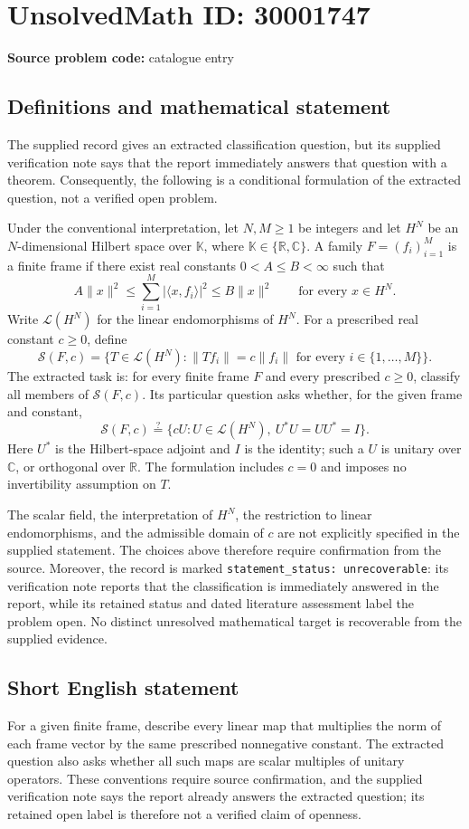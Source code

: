 \documentclass[11pt]{article}
\newcommand{\R}{\mathbb{R}}
\newcommand{\C}{\mathbb{C}}
\begin{document}
\section*{UnsolvedMath ID: 30001747}
\textbf{Source problem code:} catalogue entry
\subsection{Definitions and mathematical statement}
The supplied record gives an extracted classification question, but its supplied verification note says that the report immediately answers that question with a theorem. Consequently, the following is a conditional formulation of the extracted question, not a verified open problem.

Under the conventional interpretation, let \(N,M\geq 1\) be integers and let \(H^N\) be an \(N\)-dimensional Hilbert space over \(\mathbb K\), where \(\mathbb K\in\{\R,\C\}\). A family \(F=(f_i)_{i=1}^M\) is a finite frame if there exist real constants \(0<A\leq B<\infty\) such that
\[
A\lVert x\rVert^2\leq\sum_{i=1}^M\lvert\langle x,f_i\rangle\rvert^2\leq B\lVert x\rVert^2
\qquad\text{for every }x\in H^N.
\]
Write \(\mathcal L(H^N)\) for the linear endomorphisms of \(H^N\). For a prescribed real constant \(c\geq0\), define
\[
\mathcal S(F,c)=\bigl\{T\in\mathcal L(H^N):\lVert Tf_i\rVert=c\lVert f_i\rVert\text{ for every }i\in\{1,\ldots,M\}\bigr\}.
\]
The extracted task is: for every finite frame \(F\) and every prescribed \(c\geq0\), classify all members of \(\mathcal S(F,c)\). Its particular question asks whether, for the given frame and constant,
\[
\mathcal S(F,c)\stackrel{?}{=}\{cU:U\in\mathcal L(H^N),\ U^*U=UU^*=I\}.
\]
Here \(U^*\) is the Hilbert-space adjoint and \(I\) is the identity; such a \(U\) is unitary over \(\C\), or orthogonal over \(\R\). The formulation includes \(c=0\) and imposes no invertibility assumption on \(T\).

The scalar field, the interpretation of \(H^N\), the restriction to linear endomorphisms, and the admissible domain of \(c\) are not explicitly specified in the supplied statement. The choices above therefore require confirmation from the source. Moreover, the record is marked \texttt{statement\_status: unrecoverable}: its verification note reports that the classification is immediately answered in the report, while its retained status and dated literature assessment label the problem open. No distinct unresolved mathematical target is recoverable from the supplied evidence.
\subsection{Short English statement}
For a given finite frame, describe every linear map that multiplies the norm of each frame vector by the same prescribed nonnegative constant. The extracted question also asks whether all such maps are scalar multiples of unitary operators. These conventions require source confirmation, and the supplied verification note says the report already answers the extracted question; its retained open label is therefore not a verified claim of openness.
\end{document}
